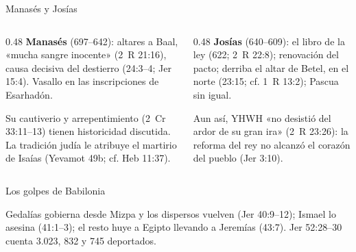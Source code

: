 \begin{frame}{Manasés y Josías}
\begin{columns}[T,onlytextwidth]
\begin{column}{0.48\textwidth}\footnotesize
\textbf{\textcolor{cafe}{Manasés}} (697--642): altares a Baal, «mucha sangre inocente» (2~R 21:16), causa decisiva del destierro (24:3--4; Jer 15:4). Vasallo en las inscripciones de Esarhadón.
\begin{notalam}
Su cautiverio y arrepentimiento (2~Cr 33:11--13) tienen historicidad discutida. La tradición judía le atribuye el martirio de Isaías (Yevamot 49b; cf. Heb 11:37).
\end{notalam}
\end{column}
\begin{column}{0.48\textwidth}\footnotesize
\textbf{\textcolor{cafe}{Josías}} (640--609): el libro de la ley (622; 2~R 22:8); renovación del pacto; derriba el altar de Betel, en el norte (23:15; cf. 1~R 13:2); Pascua sin igual.\par\smallskip
\begin{clave}\footnotesize Aun así, YHWH «no desistió del ardor de su gran ira» (2~R 23:26): la reforma del rey no alcanzó el corazón del pueblo (Jer 3:10).\end{clave}
\end{column}
\end{columns}
\end{frame}

\begin{frame}{Los golpes de Babilonia}
\centering
{}
\vspace{3pt}
\begin{notalam}
Gedalías gobierna desde Mizpa y los dispersos vuelven (Jer 40:9--12); Ismael lo asesina (41:1--3); el resto huye a Egipto llevando a Jeremías (43:7). Jer 52:28--30 cuenta 3.023, 832 y 745 deportados.
\end{notalam}
\end{frame}

